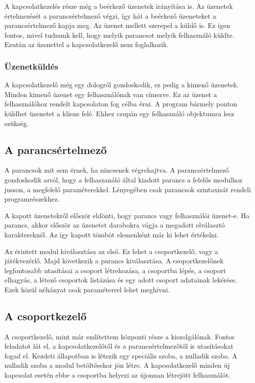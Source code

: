 \documentclass[]{article}
\begin{document}
A kapcsolatkezelés része még a beérkező üzenetek irányítása is. Az
üzenetek értelmezését a parancsértelmező végzi, így hát a beérkező
üzeneteket a parancsértelmező kapja meg. Az üzenet mellett szerepel a
küldő is. Ez igen fontos, mivel tudnunk kell, hogy melyik parancsot
melyik felhasználó küldte. Ezután az üzenettel a kapcsolatkezelő nem
foglalkozik.


\subsubsection{Üzenetküldés}

A kapcsolatkezelő még egy dologról gondoskodik, ez pedig a kimenő
üzenetek. Minden kimenő üzenet egy felhasználónak van címezve. Ez az
üzenet a felhasználóhoz rendelt kapcsolaton fog célba érni. A program
bármely ponton küldhet üzenetet a kliens felé. Ehhez csupán egy
felhasználó objektumra lesz szükség.


\subsection{A parancsértelmező}

A parancsok mit sem érnek, ha nincsenek végrehajtva. A parancsértelmező
gondoskodik arról, hogy a felhaszanáló által kiadott parancs a felelős
modulhoz jusson, a megfelelő paraméterekkel. Lényegében csak parancsok
szintaxisát rendeli programrészekhez.

A kapott üzenetekről először eldönti, hogy parancs vagy felhasználói
üzenet-e. Ha parancs, akkor először az üzenetet darabokra vágja a
megadott elválasztó karaktereknél. Az így kapott tömböt elemenként már
ki lehet értékelni.

Az érintett modul kiválasztása az első. Ez lehet a csoportkezelő, vagy a
játékvezérlő. Majd következik a parancs kiválasztása. A csoportkezelőnek
legfontosabb utasításai a csoport létrehozása, a csoportba lépés, a
csoport elhagyás, a létező csoportok listázása és egy adott csoport
adatainak lekérése. Ezek közül néhányat csak paraméterrel lehet
meghívni.


\subsection{A csoportkezelő}

A csoportkezelő, mint már említettem központi része a kiszolgálónak.
Fontos feladatot lát el, a kapcsolatkezelőtől és a parancsértelmezőtől
is utasításokat fogad el. Kezdeti állapotban is létezik egy speciális
szoba, a nulladik szoba. A nulladik szoba a modul betöltésekor jön
létre. A kapcsolatkezelő minden új kapcsolat esetén ebbe a csoportba
helyezi az újonnan létrejött felhasználót.
\end{document}
